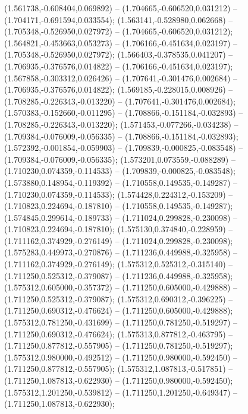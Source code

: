  (1.561738,-0.608404,0.069892) -- (1.704665,-0.606520,0.031212) -- (1.704171,-0.691594,0.033554);
 (1.563141,-0.528980,0.062668) -- (1.705348,-0.526950,0.027972) -- (1.704665,-0.606520,0.031212);
 (1.564821,-0.453663,0.053273) -- (1.706166,-0.451634,0.023197) -- (1.705348,-0.526950,0.027972);
 (1.566403,-0.378535,0.041207) -- (1.706935,-0.376576,0.014822) -- (1.706166,-0.451634,0.023197);
 (1.567858,-0.303312,0.026426) -- (1.707641,-0.301476,0.002684) -- (1.706935,-0.376576,0.014822);
 (1.569185,-0.228015,0.008926) -- (1.708285,-0.226343,-0.013220) -- (1.707641,-0.301476,0.002684);
 (1.570383,-0.152660,-0.011295) -- (1.708866,-0.151184,-0.032893) -- (1.708285,-0.226343,-0.013220);
 (1.571453,-0.077266,-0.034238) -- (1.709384,-0.076009,-0.056335) -- (1.708866,-0.151184,-0.032893);
 (1.572392,-0.001854,-0.059903) -- (1.709839,-0.000825,-0.083548) -- (1.709384,-0.076009,-0.056335);
 (1.573201,0.073559,-0.088289) -- (1.710230,0.074359,-0.114533) -- (1.709839,-0.000825,-0.083548);
 (1.573880,0.148954,-0.119392) -- (1.710558,0.149535,-0.149287) -- (1.710230,0.074359,-0.114533);
 (1.574428,0.224312,-0.153209) -- (1.710823,0.224694,-0.187810) -- (1.710558,0.149535,-0.149287);
 (1.574845,0.299614,-0.189733) -- (1.711024,0.299828,-0.230098) -- (1.710823,0.224694,-0.187810);
 (1.575130,0.374840,-0.228959) -- (1.711162,0.374929,-0.276149) -- (1.711024,0.299828,-0.230098);
 (1.575283,0.449973,-0.270876) -- (1.711236,0.449988,-0.325958) -- (1.711162,0.374929,-0.276149);
 (1.575312,0.525312,-0.315140) -- (1.711250,0.525312,-0.379087) -- (1.711236,0.449988,-0.325958);
 (1.575312,0.605000,-0.357372) -- (1.711250,0.605000,-0.429888) -- (1.711250,0.525312,-0.379087);
 (1.575312,0.690312,-0.396225) -- (1.711250,0.690312,-0.476624) -- (1.711250,0.605000,-0.429888);
 (1.575312,0.781250,-0.431699) -- (1.711250,0.781250,-0.519297) -- (1.711250,0.690312,-0.476624);
 (1.575313,0.877812,-0.463795) -- (1.711250,0.877812,-0.557905) -- (1.711250,0.781250,-0.519297);
 (1.575312,0.980000,-0.492512) -- (1.711250,0.980000,-0.592450) -- (1.711250,0.877812,-0.557905);
 (1.575312,1.087813,-0.517851) -- (1.711250,1.087813,-0.622930) -- (1.711250,0.980000,-0.592450);
 (1.575312,1.201250,-0.539812) -- (1.711250,1.201250,-0.649347) -- (1.711250,1.087813,-0.622930);
